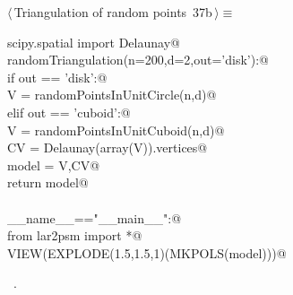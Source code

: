 \documentclass[11pt,oneside]{article}	%
\begin{document}
\begin{flushleft} \small \label{scrap48}
\protect{}$\langle\,$Triangulation of random points\nobreak\ {\footnotesize 37b}$\,\rangle\equiv$
\vspace{-1ex}
\begin{list}{}{} \item
\mbox{}\verb@from scipy.spatial import Delaunay@\\
\mbox{}\verb@def randomTriangulation(n=200,d=2,out='disk'):@\\
\mbox{}\verb@   if out == 'disk':@\\
\mbox{}\verb@      V = randomPointsInUnitCircle(n,d)@\\
\mbox{}\verb@   elif out == 'cuboid':@\\
\mbox{}\verb@      V = randomPointsInUnitCuboid(n,d)@\\
\mbox{}\verb@   CV = Delaunay(array(V)).vertices@\\
\mbox{}\verb@   model = V,CV@\\
\mbox{}\verb@   return model@\\
\mbox{}\verb@@\\
\mbox{}\verb@if __name__=="__main__":@\\
\mbox{}\verb@   from lar2psm import *@\\
\mbox{}\verb@   VIEW(EXPLODE(1.5,1.5,1)(MKPOLS(model)))@\\
\mbox{}\verb@@{\NWsep}
\end{list}
\vspace{-1ex}
\footnotesize\addtolength{\baselineskip}{-1ex}
\begin{list}{}{\setlength{\itemsep}{-\parsep}\setlength{\itemindent}{-\leftmargin}}
\item \NWtxtMacroRefIn\ .
\end{list}
\end{flushleft}
\end{document}
